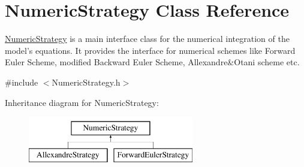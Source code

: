 \hypertarget{class_numeric_strategy}{\section{Numeric\+Strategy Class Reference}
\label{class_numeric_strategy}
}


\hyperlink{class_numeric_strategy}{Numeric\+Strategy} is a main interface class for the numerical integration of the model's equations. It provides the interface for numerical schemes like Forward Euler Scheme, modified Backward Euler Scheme, Allexandre\&Otani scheme etc.  




{\ttfamily \#include $<$Numeric\+Strategy.\+h$>$}

Inheritance diagram for Numeric\+Strategy\+:\begin{figure}[H]
\begin{center}
\leavevmode
\includegraphics[height=2.000000cm]{class_numeric_strategy}
\end{center}
\end{figure}
